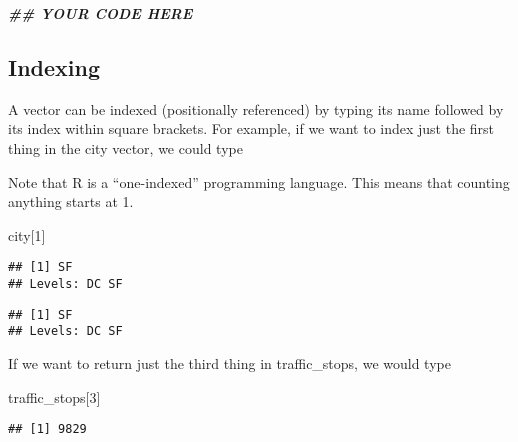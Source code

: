 \documentclass[
]{article}
\newenvironment{Shaded}{\begin{snugshade}}{\end{snugshade}}
\newcommand{\CommentTok}[1]{\textcolor[rgb]{0.56,0.35,0.01}{\textit{#1}}}
\newcommand{\DecValTok}[1]{\textcolor[rgb]{0.00,0.00,0.81}{#1}}
\newcommand{\DocumentationTok}[1]{\textcolor[rgb]{0.56,0.35,0.01}{\textbf{\textit{#1}}}}
\newcommand{\NormalTok}[1]{#1}
\newcommand{\SpecialCharTok}[1]{\textcolor[rgb]{0.00,0.00,0.00}{#1}}
\begin{document}
\begin{Shaded}
\begin{Highlighting}[]
\DocumentationTok{\#\# YOUR CODE HERE}
\end{Highlighting}
\end{Shaded}

\hypertarget{indexing}{%
\subsection{Indexing}\label{indexing}}

A vector can be indexed (positionally referenced) by typing its name
followed by its index within square brackets. For example, if we want to
index just the first thing in the city vector, we could type

Note that R is a ``one-indexed'' programming language. This means that
counting anything starts at 1.

\begin{Shaded}
\begin{Highlighting}[]
\NormalTok{city[}\DecValTok{1}\NormalTok{]}
\end{Highlighting}
\end{Shaded}

\begin{verbatim}
## [1] SF
## Levels: DC SF
\end{verbatim}

\begin{Shaded}
\end{Shaded}

\begin{verbatim}
## [1] SF
## Levels: DC SF
\end{verbatim}

If we want to return just the third thing in traffic\_stops, we would
type

\begin{Shaded}
\begin{Highlighting}[]
\NormalTok{traffic\_stops[}\DecValTok{3}\NormalTok{]}
\end{Highlighting}
\end{Shaded}

\begin{verbatim}
## [1] 9829
\end{verbatim}
\end{document}
